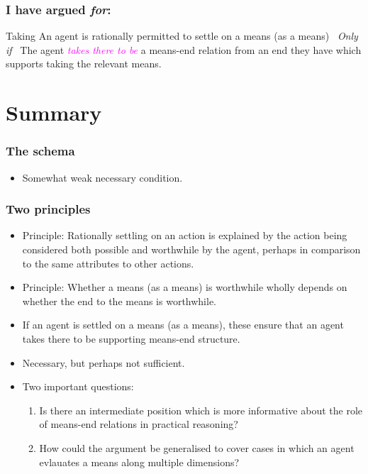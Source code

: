 \documentclass[noamssymb, compress, handout]{beamer} %
\newcommand{\hozlinedash}[0]{%
  \noindent\hdashrule[0.5ex][c]{\textwidth}{.1pt}{2.5pt}
}
\begin{document}
\begin{frame}
  \frametitle{I have argued \emph{for}:}
    \begin{block}{Taking}
    An agent is rationally permitted to settle on a means (as a means)
    \newline
    \mbox{ }\hfill\emph{Only if}\hfill\mbox{ }
    \newline
    The agent \textcolor{fuchsia}{\emph{takes there to be}} a means-end relation from an end they have which supports taking the relevant means.
  \end{block}
\end{frame}

\section{Summary}
\label{sec:summary}


\begin{frame}
  \frametitle{The schema}



  \begin{itemize}
  \item Somewhat weak necessary condition.
    
  \end{itemize}
\end{frame}


\begin{frame}
  \frametitle{Two principles}

  \begin{itemize}
  \item Principle: Rationally settling on an action is explained by the action being considered both possible and worthwhile by the agent, perhaps in comparison to the same attributes to other actions.
  \item Principle: Whether a means (as a means) is worthwhile wholly depends on whether the end to the means is worthwhile.
  \end{itemize}

  \hozlinedash

  \begin{itemize}
  \item If an agent is settled on a means (as a means), these ensure that an agent takes there to be supporting means-end structure.
  \item Necessary, but perhaps not sufficient.
  \end{itemize}

  \begin{itemize}
  \item Two important questions:
    \begin{enumerate}
    \item Is there an intermediate position which is more informative about the role of means-end relations in practical reasoning?
    \item How could the argument be generalised to cover cases in which an agent evlauates a means along multiple dimensions?
    \end{enumerate}
  \end{itemize}

 \end{frame}
\end{document}
